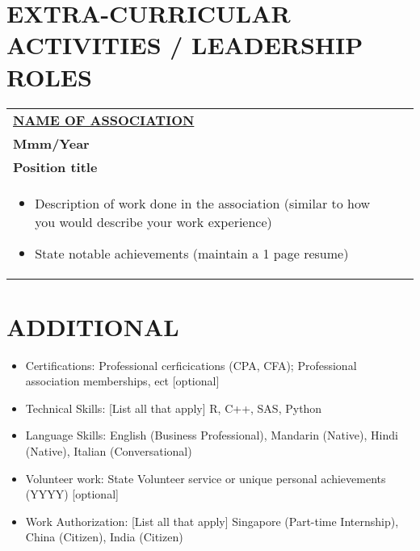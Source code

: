 \documentclass[a4paper,8pt]{article}
\begin{document}
\section{\textbf{EXTRA-CURRICULAR ACTIVITIES / LEADERSHIP ROLES}}
\begin{tabularx}{\linewidth}{ @{}l r@{} }
\textbf{\href{https://github.com/}{NAME OF ASSOCIATION}} \\[4pt]
\textbf{Mmm/Year} \\[4pt]
\textbf{Position title} \\[4pt]
\begin{minipage}[t]{\linewidth}
    \begin{itemize}[nosep,after=\strut, leftmargin=1em, itemsep=2pt]
        \item Description of work done in the association (similar to how you would describe your work experience)
        \item State notable achievements (maintain a 1 page resume)
    \end{itemize}
\end{minipage}
\end{tabularx}

\section{\textbf{ADDITIONAL}}
\begin{minipage}[t]{\linewidth}
    \begin{itemize}[nosep,after=\strut, leftmargin=1em, itemsep=2pt]
        \item Certifications: Professional cerficications (CPA, CFA); Professional association memberships, ect [optional]
        \item Technical Skills: [List all that apply] R, C++, SAS, Python 
        \item Language Skills: English (Business Professional), Mandarin 
        (Native), Hindi (Native), Italian (Conversational)
        \item Volunteer work: State Volunteer service or unique personal achievements (YYYY) [optional]
        \item Work Authorization: [List all that apply] Singapore (Part-time Internship), China (Citizen), India (Citizen)
    \end{itemize}
\end{minipage}
\end{document}
